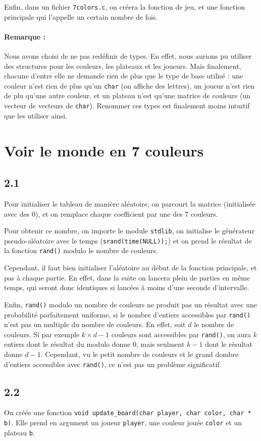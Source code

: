 \documentclass[12pt]{article}
\def\question#1{\subsection*{#1}}
\def\sec#1{\section{#1}}
\begin{document}
Enfin, dans un fichier \texttt{7colors.c}, on créera la fonction de jeu, et une fonction principale qui l'appelle un certain nombre de fois.

\paragraph{Remarque :} Nous avons choisi de ne pas redéfinir de types. En effet, nous aurions pu utiliser des structures pour les couleurs, les plateaux et les joueurs. Mais finalement, chacune d'entre elle ne demande rien de plus que le type de base utilisé : une couleur n'est rien de plus qu'un \texttt{char} (on affiche des lettres), un joueur n'est rien de plu qu'une autre couleur, et un plateau n'est qu'une matrice de couleurs (un vecteur de vecteurs de \texttt{char}). Renommer ces types est finalement moins intuitif que les utiliser ainsi.



\sec{Voir le monde en 7 couleurs}
\question{2.1}
Pour initialiser le tableau de manière aléatoire, on parcourt la matrice (initialisée avec des 0), et on remplace chaque coefficient par une des 7 couleurs.

Pour obtenir ce nombre, on importe le module \texttt{stdlib}, on initialise le générateur pseudo-aléatoire avec le temps (\texttt{srand(time(NULL));}) et on prend le résultat de la fonction \texttt{rand()} modulo le nombre de couleurs.

Cependant, il faut bien initialiser l'aléatoire au début de la fonction principale, et pas à chaque partie. En effet, dans la suite on lancera plein de parties en même temps, qui seront donc identiques si lancées à moins d'une seconde d'intervalle.

Enfin, \texttt{rand()} modulo un nombre de couleurs ne produit pas un résultat avec une probabilité parfaitement uniforme, si le nombre d'entiers accessibles par \texttt{rand()} n'est pas un multiple du nombre de couleurs. En effet, soit $d$ le nombre de couleurs. Si par exemple $k\times d - 1$ couleurs sont accessibles par \texttt{rand()}, on aura $k$ entiers dont le résultat du modulo donne 0, mais seulment $k-1$ dont le résultat donne $d-1$.
Cependant, vu le petit nombre de couleurs et le grand dombre d'entiers accessibles avec \texttt{rand()}, ce n'est pas un problème significatif.

\question{2.2}
On créée une fonction \texttt{void update\_board(char player, char color, char * b)}. Elle prend en argument un joueur \texttt{player}, une couleur jouée \texttt{color} et un plateau \texttt{b}.
\end{document}
